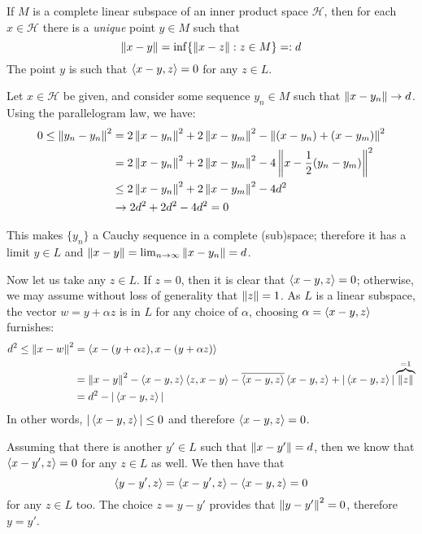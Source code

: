 \begin{blemma}{}{}
If $M$ is a complete linear subspace of an inner product space $\mathcal{H}$, then for each $x\in\mathcal{H}$ there is a \emph{unique} point $y\in M$ such that \[ \left\lVert x-y \right\rVert = \inf\{ \left\lVert x-z \right\rVert : z\in M \} =: d \]
The point $y$ is such that \mbox{$\left\langle x-y, z \right\rangle = 0$} for any $z\in L$.
\end{blemma}
\begin{bproof}{}{}
Let $x\in\mathcal{H}$ be given, and consider some sequence $y_{n}\in M$ such that $\left\lVert x-y_{n} \right\rVert \to d$. Using the parallelogram law, we have:
\begin{equation}
    \begin{split}
        0\leq \left\lVert y_{n} - y_{n} \right\rVert^{2} &= 2\left\lVert x - y_{n} \right\rVert^{2} + 2\left\lVert x - y_{m} \right\rVert^{2} - \left\lVert (x - y_{n}) + (x - y_{m}) \right\rVert^{2} \\
        &= 2\left\lVert x - y_{n} \right\rVert^{2} + 2\left\lVert x - y_{m} \right\rVert^{2} - 4\left\lVert x - \frac{1}{2}(y_{n} - y_{m}) \right\rVert^{2} \\
        &\leq 2\left\lVert x - y_{n} \right\rVert^{2} + 2\left\lVert x - y_{m} \right\rVert^{2} - 4d^{2} \\
        &\to 2d^{2} + 2d^{2} - 4d^{2} = 0
    \end{split}
\end{equation}

This makes $\{y_{n} \}$ a Cauchy sequence in a complete (sub)space; therefore it has a limit $y\in L$ and \mbox{$\left\lVert x - y \right\rVert = \lim_{n\to\infty}\left\lVert x - y_{n} \right\rVert = d$}.

Now let us take any $z\in L$. If $z=0$, then it is clear that $\left\langle x-y, z \right\rangle = 0$; otherwise, we may assume without loss of generality that $\left\lVert z \right\rVert=1$. As $L$ is a linear subspace, the vector $w = y + \alpha z$ is in $L$ for any choice of $\alpha$, choosing $\alpha = \left\langle x-y, z \right\rangle$ furnishes:
\begin{equation}
    \begin{split}
        d^{2} \leq \left\lVert x-w \right\rVert^{2} &= \left\langle x-(y+\alpha z), x-(y+\alpha z) \right\rangle \\
        &= \left\lVert x-y \right\rVert^{2} - \left\langle x-y, z \right\rangle\left\langle z, x-y \right\rangle - \overline{\left\langle x-y, z \right\rangle}\left\langle x-y, z \right\rangle + |\left\langle x-y, z \right\rangle| \overbrace{\left\lVert z \right\rVert}^{=1} \\
        &= d^{2} - |\left\langle x-y, z \right\rangle|
    \end{split}
\end{equation}
In other words, \mbox{$|\left\langle x-y, z \right\rangle|\leq 0$} and therefore $\left\langle x-y, z \right\rangle = 0$.

Assuming that there is another $y'\in L$ such that $\left\lVert x-y' \right\rVert =d$, then we know that $\left\langle x-y', z \right\rangle = 0$ for any $z\in L$ as well. We then have that \[\left\langle y - y', z \right\rangle = \left\langle x - y', z \right\rangle - \left\langle x - y, z \right\rangle = 0 \] for any $z\in L$ too. The choice $z = y - y'$ provides that $\left\lVert y - y' \right\rVert^{2} = 0$, therefore $y = y'$.
\eop
\end{bproof}


